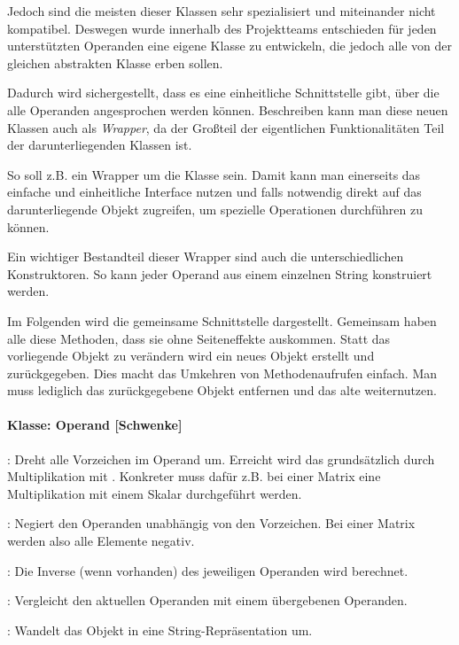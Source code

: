 Jedoch sind die meisten dieser Klassen sehr spezialisiert und miteinander nicht kompatibel. Deswegen wurde innerhalb des Projektteams entschieden für jeden unterstützten Operanden eine eigene Klasse zu entwickeln, die jedoch alle von der gleichen abstrakten Klasse  erben sollen. 

Dadurch wird sichergestellt, dass es eine einheitliche Schnittstelle gibt, über die alle Operanden angesprochen werden können. Beschreiben kann man diese neuen Klassen auch als \textit{Wrapper}, da der Großteil der eigentlichen Funktionalitäten Teil der darunterliegenden Klassen ist. 

So soll z.B.  ein Wrapper um die Klasse  sein. Damit kann man einerseits das einfache und einheitliche Interface nutzen und falls notwendig direkt auf das darunterliegende Objekt zugreifen, um spezielle Operationen durchführen zu können. 

Ein wichtiger Bestandteil dieser Wrapper sind auch die unterschiedlichen Konstruktoren. So kann jeder Operand aus einem einzelnen String konstruiert werden. 

Im Folgenden wird die gemeinsame Schnittstelle dargestellt. Gemeinsam haben alle diese Methoden, dass sie ohne Seiteneffekte auskommen. Statt das vorliegende Objekt zu verändern wird ein neues Objekt erstellt und zurückgegeben. Dies macht das Umkehren von Methodenaufrufen einfach. Man muss lediglich das zurückgegebene Objekt entfernen und das alte weiternutzen.

\paragraph{Klasse: Operand [Schwenke]}

: Dreht alle Vorzeichen im Operand um. Erreicht wird das grundsätzlich durch Multiplikation mit . Konkreter muss dafür z.B. bei einer Matrix eine Multiplikation mit einem Skalar durchgeführt werden.

: Negiert den Operanden unabhängig von den Vorzeichen. Bei einer Matrix werden also alle Elemente negativ.

: Die Inverse (wenn vorhanden) des jeweiligen Operanden wird berechnet.

: Vergleicht den aktuellen Operanden mit einem übergebenen Operanden.

: Wandelt das Objekt in eine String-Repräsentation um.

